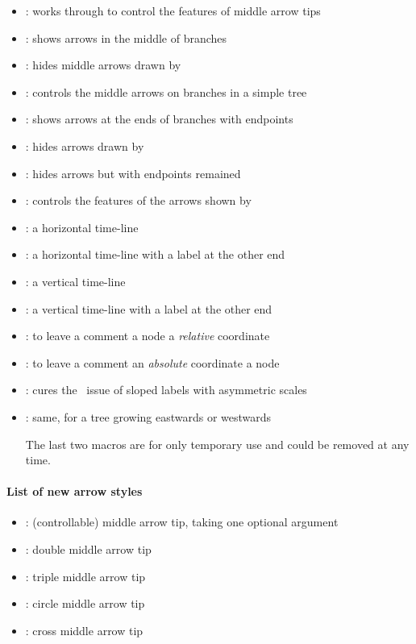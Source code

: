 \begin{itemize}
\item \cmd{\setxtarrowtips}: works through \xw{->-} to control the features of middle arrow tips
\item \cmd{\xtShowMidArrows}: shows arrows in the middle of branches
\item \cmd{\xtHideMidArrows}: hides middle arrows drawn by \cmd{\xtShowMidArrows}
\item \cmd{\setxtshowmidarrows}: controls the middle arrows on branches in a simple tree 
\item \cmd{\xtShowArrows}: shows arrows at the ends of branches with endpoints
\item \cmd{\xtHideArrows}: hides arrows drawn by \cmd{\xtShowArrows}
\item \cmd{\xtHideArrows*}: hides arrows but with endpoints remained
\item \cmd{\setxtshowarrows}: controls the features of the arrows shown by \cmd{\xtShowArrows}
%
\listdivider

\item \cmd{\xtTimeLineH}: a horizontal time-line
\item {}: a horizontal time-line with a label at the other end
\item \cmd{\xtTimeLineV}: a vertical time-line
\item {}: a vertical time-line with a label at the other end
\item \cmd{\xtCommentTo}: to leave a comment  a node  a \emph{relative} coordinate
\item \cmd{\xtCommentFrom}: to leave a comment  an \emph{absolute} coordinate  a node
%
\listdivider

\item \cmd{\xtcureslopedlabelsNS}: cures the \TikZ\ issue of sloped labels with asymmetric scales
\item \cmd{\xtcureslopedlabelsEW}: same, for a tree growing eastwards or westwards\par
      The last two macros are for only temporary use and could be removed at any time.
\end{itemize}


\paragraph{List of new arrow styles}

\begin{itemize}\tightlist
\item \xw{->-}: (controllable) middle arrow tip, taking one optional argument
\item \xw{->>-}: double middle arrow tip
\item \xw{->>>-}: triple middle arrow tip
\item {}: circle middle arrow tip
\item {}: cross middle arrow tip
\end{itemize}

